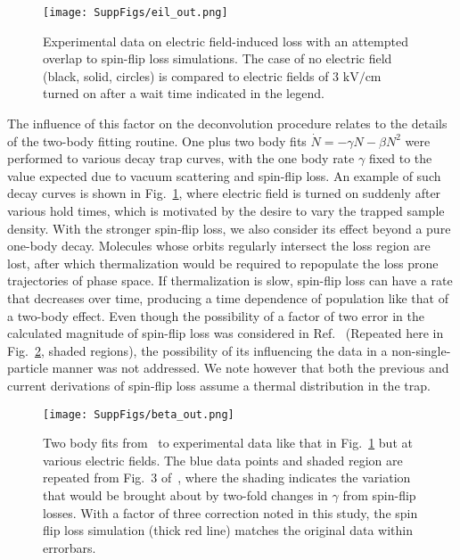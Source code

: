 \documentclass[%
 reprint,
 amsmath,amssymb,
 aps,
prl,
]{revtex4-1}
\begin{document}
\begin{figure}[t]
\texttt{[image: SuppFigs/eil\_out.png]}
\caption{Experimental data on electric field-induced loss with an attempted overlap to spin-flip loss simulations. The case of no electric field (black, solid, circles) is compared to electric fields of $3\text{ kV/cm}$ turned on after a wait time indicated in the legend.
\label{fig:eil}}
\end{figure}

The influence of this factor on the deconvolution procedure relates to the details of the two-body fitting routine.
One plus two body fits $\dot{N}=-\gamma N-\beta N^2$ were performed to various decay trap curves, with the one body rate $\gamma$ fixed to the value expected due to vacuum scattering and spin-flip loss.
An example of such decay curves is shown in Fig.~\ref{fig:eil}, where electric field is turned on suddenly after various hold times, which is motivated by the desire to vary the trapped sample density.
With the stronger spin-flip loss, we also consider its effect beyond a pure one-body decay. Molecules whose orbits regularly intersect the loss region are lost, after which thermalization would be required to repopulate the loss prone trajectories of phase space. If thermalization is slow, spin-flip loss can have a rate that decreases over time, producing a time dependence of population like that of a two-body effect.
Even though the possibility of a factor of two error in the calculated magnitude of spin-flip loss was considered in Ref.~\cite{Stuhl2013} (Repeated here in Fig.~\ref{fig:beta}, shaded regions), the possibility of its influencing the data in a non-single-particle manner was not addressed. We note however that both the previous and current derivations of spin-flip loss assume a thermal distribution in the trap.

\begin{figure}[t]
\texttt{[image: SuppFigs/beta\_out.png]}
\caption{Two body fits from~\cite{Stuhl2013} to experimental data like that in Fig.~\ref{fig:eil} but at various electric fields. The blue data points and shaded region are repeated from Fig.~3 of~\cite{Stuhl2013}, where the shading indicates the variation that would be brought about by two-fold changes in $\gamma$ from spin-flip losses. With a factor of three correction noted in this study, the spin flip loss simulation (thick red line) matches the original data within errorbars.\label{fig:beta}}
\end{figure}
\end{document}
